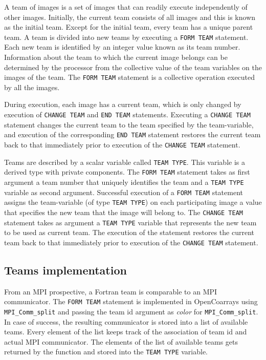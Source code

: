A team of images is a set of images that can readily execute independently of other images.
Initially, the current team consists of all images and this is
known as the initial team. Except for the initial team, every team has a unique parent team. A team is divided
into new teams by executing a \texttt{FORM TEAM} statement.
Each new team is identified by an integer value known
as its team number. Information about the team to which the current image belongs can be determined by the
processor from the collective value of the team variables on the images of the team.
The \texttt{FORM TEAM} statement is a collective operation executed by all the images.

During execution, each image has a current team, which is only changed by execution of \texttt{CHANGE TEAM} and
\texttt{END TEAM} statements. Executing a \texttt{CHANGE TEAM} statement changes the current team to the team specified
by the team-variable, and execution of the corresponding \texttt{END TEAM} statement restores the current team back
to that immediately prior to execution of the \texttt{CHANGE TEAM} statement.

Teams are described by a scalar variable called \texttt{TEAM TYPE}. This variable is a derived type with private components.
The \texttt{FORM TEAM} statement takes as first argument a team number that uniquely identifies the team and a \texttt{TEAM TYPE}
variable as second argument.
Successful execution of a \texttt{FORM TEAM} statement assigns the team-variable (of type \texttt{TEAM TYPE}) on each
participating image a value that specifies the new team that the image will belong to.
The \texttt{CHANGE TEAM} statement takes as argument a \texttt{TEAM TYPE} variable that represents the new team to be used as
current team. The execution of the  statement restores the current team back
to that immediately prior to execution of the \texttt{CHANGE TEAM} statement.

\subsection{Teams implementation}\label{subsec:teams_implementation}

From an MPI prospective, a Fortran team is comparable to an MPI communicator. The \texttt{FORM TEAM} statement is implemented in OpenCoarrays
using \texttt{MPI\_Comm\_split} and passing the team id argument as \textit{color} for \texttt{MPI\_Comm\_split}.
In case of success, the resulting communicator is stored into a list of available teams.
Every element of the list keeps track of the association of team id and actual MPI communicator.
The elements of the list of available teams gets returned by the function and stored into the \texttt{TEAM TYPE} variable.

